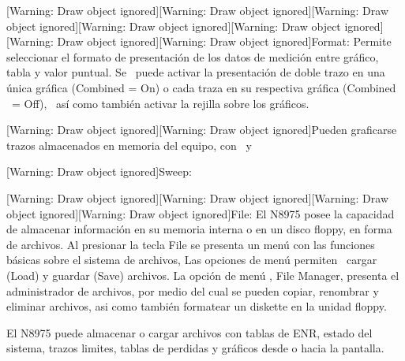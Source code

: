 \documentclass[paper=letter,oneside,fontsize=10pt,parskip=full]{article}
\begin{document}
\bigskip


\bigskip


\bigskip


\bigskip


\bigskip


\bigskip


\bigskip


\bigskip


\bigskip


\bigskip


\bigskip


\bigskip


\bigskip


\bigskip

[Warning: Draw object ignored][Warning: Draw object ignored][Warning: Draw object ignored][Warning: Draw object
ignored][Warning: Draw object ignored][Warning: Draw object ignored][Warning: Draw object ignored]Format: Permite
seleccionar el formato de presentación de los datos de medición entre gráfico, tabla y valor puntual. Se \ puede
activar la presentación de doble trazo en una única gráfica (Combined = On) o cada traza en su respectiva gráfica
(Combined \ = Off), \ así como también activar la rejilla sobre los gráficos. 

[Warning: Draw object ignored][Warning: Draw object ignored]Pueden graficarse trazos almacenados en memoria del equipo,
con \ y


\bigskip


\bigskip


\bigskip


\bigskip


\bigskip

[Warning: Draw object ignored]Sweep:

\clearpage
\bigskip

[Warning: Draw object ignored][Warning: Draw object ignored][Warning: Draw object ignored][Warning: Draw object
ignored]File: El N8975 posee la capacidad de almacenar información en su memoria interna o en un disco floppy, en forma
de archivos. Al presionar la tecla File se presenta un menú con las funciones básicas sobre el sistema de archivos, Las
opciones de menú permiten \ cargar (Load) y guardar (Save) archivos. La opción de menú , File Manager, presenta el
administrador de archivos, por medio del cual se pueden copiar, renombrar y eliminar archivos, asi como también
formatear un diskette en la unidad floppy.

El N8975 puede almacenar o cargar archivos con tablas de ENR, estado del sistema, trazos limites, tablas de perdidas y
gráficos desde o hacia la pantalla. 
\end{document}
